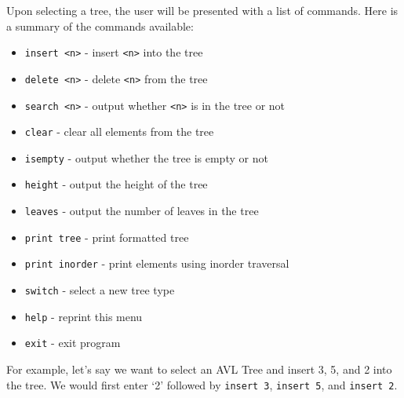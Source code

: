 \documentclass[11pt, letterpaper]{article}
\begin{document}
Upon selecting a tree, the user will be presented with a list of commands. Here is a summary of the commands available:
\begin{itemize}
    \item \texttt{insert <n>}     - insert \texttt{<n>} into the tree
    \item \texttt{delete <n>}     - delete \texttt{<n>} from the tree
    \item \texttt{search <n>}     - output whether \texttt{<n>} is in the tree or not
    \item \texttt{clear}          - clear all elements from the tree
    \item \texttt{isempty}        - output whether the tree is empty or not
    \item \texttt{height}         - output the height of the tree
    \item \texttt{leaves}         - output the number of leaves in the tree
    \item \texttt{print tree}     - print formatted tree
    \item \texttt{print inorder}  - print elements using inorder traversal
    \item \texttt{switch}         - select a new tree type
    \item \texttt{help}           - reprint this menu
    \item \texttt{exit}           - exit program
\end{itemize}

For example, let's say we want to select an AVL Tree and insert 3, 5, and 2 into the tree. We would first enter `2' followed by \texttt{insert 3}, \texttt{insert 5}, and \texttt{insert 2}.
\end{document}
